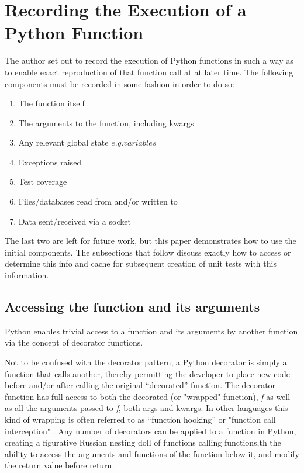 \section{Recording the Execution of a Python Function}\label{sec:approach}
The author set out to record the execution of Python functions
in such a way as to enable exact reproduction of that 
function call at at later time.  The following components
must be recorded in some fashion in order to do so:
\begin{enumerate}
  \item The function itself
  \item The arguments to the function, including kwargs
  \item Any relevant global state \(e.g. variables\)
  \item Exceptions raised
  \item Test coverage
  \item Files/databases read from and/or written to
  \item Data sent/received via a socket
\end{enumerate}

The last two are left for future work, but this paper demonstrates how to use 
the initial components. The subsections that follow discuss exactly how to 
access or determine this info and cache for subsequent creation of unit tests
with this information.
\subsection{Accessing the function and its arguments}\label{sec:approach-internal-1}

Python enables trivial access to a function and 
its arguments by another function via the concept of 
decorator functions.

Not to be confused with the decorator pattern, a Python decorator is simply a 
function that calls another, thereby permitting the developer to place new code 
before and/or after calling the original “decorated” function.  
The decorator function has full access to both the decorated 
(or "wrapped" function), \textit{f} as well as all the 
arguments passed to \textit{f}, both args and kwargs.  In other 
languages this kind of wrapping is often referred to as 
“function hooking” or "function call interception" 
 \cite{kang2018function}. Any number of decorators can be applied to a function 
in Python, creating a figurative Russian nesting doll of
functions calling functions,th the ability to access the 
arguments and functions of the function below it, and modify the 
return value before return.

